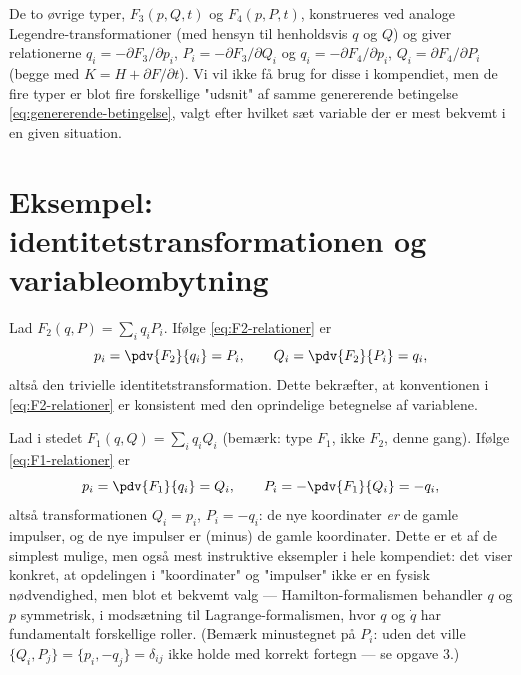 \begin{bemaerkning}
De to øvrige typer, $F_3(p,Q,t)$ og $F_4(p,P,t)$, konstrueres ved
analoge Legendre-transformationer (med hensyn til henholdsvis $q$ og
$Q$) og giver relationerne
$q_i=-\partial F_3/\partial p_i$, $P_i=-\partial F_3/\partial Q_i$
og $q_i=-\partial F_4/\partial p_i$, $Q_i=\partial F_4/\partial P_i$
(begge med $K=H+\partial F/\partial t$). Vi vil ikke få brug for disse
i kompendiet, men de fire typer er blot fire forskellige "udsnit" af
samme genererende betingelse \eqref{eq:genererende-betingelse}, valgt
efter hvilket sæt variable der er mest bekvemt i en given situation.
\end{bemaerkning}

\section{Eksempel: identitetstransformationen og variableombytning}

\begin{eksempel}
Lad $F_2(q,P) = \sum_i q_iP_i$. Ifølge \eqref{eq:F2-relationer} er
\begin{equation}
  p_i = \pdv{F_2}{q_i} = P_i, \qquad Q_i = \pdv{F_2}{P_i} = q_i,
\end{equation}
altså den trivielle identitetstransformation. Dette bekræfter, at
konventionen i \eqref{eq:F2-relationer} er konsistent med den
oprindelige betegnelse af variablene.
\end{eksempel}

\begin{eksempel}
Lad i stedet $F_1(q,Q) = \sum_i q_iQ_i$ (bemærk: type $F_1$, ikke
$F_2$, denne gang). Ifølge \eqref{eq:F1-relationer} er
\begin{equation}
  p_i = \pdv{F_1}{q_i} = Q_i, \qquad P_i = -\pdv{F_1}{Q_i} = -q_i,
\end{equation}
altså transformationen $Q_i=p_i$, $P_i=-q_i$: de nye koordinater
\emph{er} de gamle impulser, og de nye impulser er (minus) de gamle
koordinater. Dette er et af de simplest mulige, men også mest
instruktive eksempler i hele kompendiet: det viser konkret, at
opdelingen i "koordinater" og "impulser" ikke er en fysisk nødvendighed,
men blot et bekvemt valg — Hamilton-formalismen behandler $q$ og $p$
symmetrisk, i modsætning til Lagrange-formalismen, hvor $q$ og
$\dot q$ har fundamentalt forskellige roller. (Bemærk minustegnet
på $P_i$: uden det ville $\{Q_i,P_j\}=\{p_i,-q_j\}=\delta_{ij}$ ikke
holde med korrekt fortegn — se opgave 3.)
\end{eksempel}

